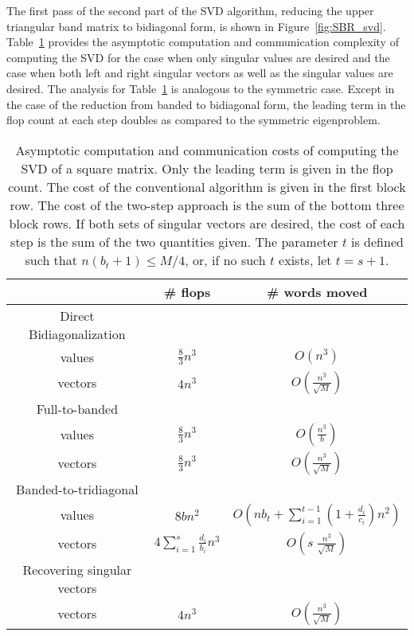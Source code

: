 \documentclass{article}
\def\lt{\left}
\def\rt{\right}
\theoremstyle{definition}
\begin{document}
The first pass of the second part of the SVD algorithm, reducing the upper triangular band matrix to bidiagonal form, is shown in
Figure~\ref{fig:SBR_svd}.  Table~\ref{tab:SBRSVD} provides the asymptotic computation and communication complexity of computing the SVD for the
case when only singular values are desired and the case when both left and right singular vectors as well as the singular values are desired.  The
analysis for Table~\ref{tab:SBRSVD} is analogous to the symmetric case.  Except in the case of the reduction from banded to bidiagonal form, the
leading term in the flop count at each step doubles as compared to the symmetric eigenproblem.

\begin{table} \centering
  \begin{tabular}{| c | c | c |} \hline
& \# flops & \# words moved \\ \hline \hline
    Direct Bidiagonalization & & \\
    values & $\frac83 n^3$ & $O\lt(n^3\rt)$ \\
    vectors & $4n^3$ & $O\lt(\frac{n^3}{\sqrt M}\rt)$ \\ \hline \hline
    Full-to-banded & & \\
    values & $\frac83 n^3$ & $O\lt(\frac{n^3}{b}\rt)$\\
    vectors & $\frac83 n^3$ & $O\lt(\frac{n^3}{\sqrt M}\rt)$ \\ \hline
    Banded-to-tridiagonal & & \\
    values & $8bn^2$ & $\displaystyle O\lt(nb_t + \sum_{i=1}^{t-1} \lt(1+\frac{d_i}{c_i}\rt)n^2 \rt)$ \\
    vectors & $\displaystyle 4\sum_{i=1}^s \frac{d_i}{b_i} n^3$ & $\displaystyle O\lt(s\;\frac{n^3}{\sqrt M}\rt)$ \\ \hline
    Recovering singular vectors & & \\
    vectors & $4n^3$ & $\displaystyle O\lt(\frac{n^3}{\sqrt M}\rt)$ \\ \hline
  \end{tabular}
  \caption{Asymptotic computation and communication costs of computing the SVD of a square matrix.  Only the leading term is given in the flop
count.  The cost of the conventional algorithm is given in the first block row.  The cost of the two-step approach is the sum of the bottom three
block rows.  If both sets of singular vectors are desired, the cost of each step is the sum of the two quantities given.  The parameter $t$ is
defined such that $n(b_t+1)\leq M/4$, or, if no such $t$ exists, let $t=s+1$.}
  \label{tab:SBRSVD}
\end{table}
\end{document}
